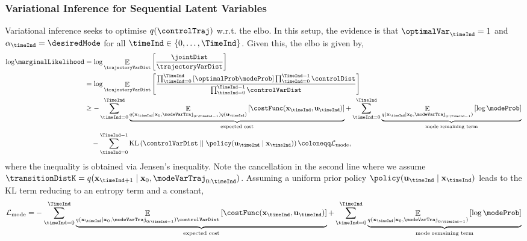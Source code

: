 \documentclass{mimosis-class/mimosis}
\numberwithin{equation}{chapter}
\DeclareMathOperator{\E}{\mathbb{E}}
\newcommand{\state}{\ensuremath{\mathbf{x}}}
\newcommand{\control}{\ensuremath{\mathbf{u}}}
\newcommand{\modeVar}{\ensuremath{\alpha}}
\begin{document}
{\subsubsection{Variational Inference for Sequential Latent Variables}
\label{sec:org2ceae1a}
Variational inference seeks to optimise \(q(\controlTraj)\)
w.r.t. the \acrfull{elbo}.
In this setup, the evidence is that \(\optimalVar_{\timeInd}=1\) and \(\modeVar_{\timeInd}=\desiredMode\) for
all \(\timeInd \in \{0,\ldots,\TimeInd\}\).
Given this, the \acrshort{elbo} is given by,
\begin{align} \label{eq-}
\text{log} \marginalLikelihood
&= \text{log} \E_{\trajectoryVarDist} \left[ \frac{\jointDist}{\trajectoryVarDist} \right] \nonumber \\
&= \text{log} \E_{\trajectoryVarDist} \left[
\frac{\prod_{\timeInd=0}^{\TimeInd} \left[\optimalProb \modeProb \right]
\prod_{\timeInd=0}^{\TimeInd-1}\controlDist}{\prod_{\timeInd=0}^{\TimeInd-1}  \controlVarDist}
\right] \nonumber \\
&\geq - \sum_{\timeInd=0}^{\TimeInd}
\underbrace{\E_{q(\state_{\timeInd}\mid \state_0, \modeVarTraj_{0:\timeInd-1}) q(\control_{\timeInd} )}
\left[ \costFunc(\state_\timeInd, \control_\timeInd) \right]}_{\text{expected cost}}
+ \sum_{\timeInd=0}^{\TimeInd}
\underbrace{\E_{ q(\state_{\timeInd} \mid \state_0, \modeVarTraj_{0:\timeInd-1})}
\left[ \log \modeProb\right]}_{\text{mode remaining term}} \nonumber \\
&\quad - \sum_{\timeInd=0}^{\TimeInd-1}
\text{KL}\left(\controlVarDist \mid\mid \policy(\control_\timeInd \mid \state_\timeInd) \right)  \coloneqq \mathcal{L}_{\text{mode}},
\end{align}
where the inequality is obtained via Jensen's inequality.
Note the cancellation in the second line where
we assume \(\transitionDistK=q(\state_{\timeInd+1} \mid \state_0, \modeVarTraj_{0:\timeInd})\).
Assuming a uniform prior policy \(\policy(\control_\timeInd \mid \state_\timeInd)\) leads to the \(\text{KL}\)
term reducing to an entropy term and a constant,
\begin{align} \label{eq-traj-opt-elbo}
\mathcal{L}_{\text{mode}} = &-\sum_{\timeInd=0}^{\TimeInd}
\underbrace{\E_{q(\state_{\timeInd} \mid \state_0, \modeVarTraj_{0:\timeInd-1}) \controlVarDist }
\left[ \costFunc(\state_\timeInd, \control_\timeInd) \right]}_{\text{expected cost}}
+ \sum_{\timeInd=0}^{\TimeInd} \underbrace{\E_{ q(\state_{\timeInd} \mid \state_0, \modeVarTraj_{0:\timeInd-1})}
\left[
\log \modeProb \right]}_{\text{mode remaining term}} \nonumber \\

\end{align}}
\end{document}
